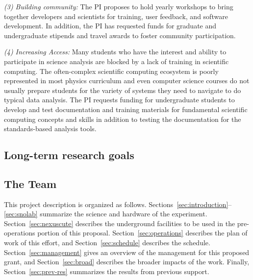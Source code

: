 {\it (3) Building community:} The PI proposes to hold yearly workshops to bring together developers and scientists for training, user feedback, and software development.  In addition, the PI has requested funds for graduate and undergraduate stipends and travel awards to foster community participation.

{\it (4) Increasing Access:} Many students who have the interest and ability to participate in science analysis are blocked by a lack of training in scientific computing.  The often-complex scientific computing ecosystem is poorly represented in most physics curriculum and even computer science courses do not usually prepare students for the variety of systems they need to navigate to do typical data analysis.  The PI requests funding for undergraduate students to develop and test documentation and training materials for fundamental scientific computing concepts and skills in addition to testing the documentation for the standards-based analysis tools.

\subsection{Long-term research goals}


\subsection{The Team}

 This project description is organized as follows. 
Sections~\ref{sec:introduction}--\ref{sec:snolab} summarize the science and hardware of the \scs experiment. 
Section~\ref{sec:nexuscute} describes the underground facilities to be used in the pre-operations portion of this proposal.
Section~\ref{sec:operations} describes the plan of work of this effort, and Section~\ref{sec:schedule} describes the schedule.
Section~\ref{sec:management} gives an overview of the management for this proposed grant, and Section~\ref{sec:broad} describes the broader impacts of the work.
Finally, Section~\ref{sec:prev-res} summarizes the results from previous support.

